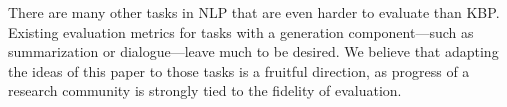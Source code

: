 There are many other tasks in NLP that are even harder to evaluate than KBP.
Existing evaluation metrics for tasks with a generation component---such as summarization or dialogue---leave much to be desired.
We believe that adapting the ideas of this paper to those tasks is a fruitful direction,
as progress of a research community is strongly tied to the fidelity of evaluation.

